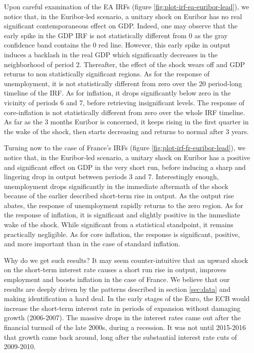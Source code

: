 \documentclass[
  11pt,
]{article}
\begin{document}
Upon careful examination of the EA IRFs (figure \ref{fig:plot-irf-ea-euribor-lead}), we notice that, in the Euribor-led scenario, a unitary shock on Euribor has no real significant contemporaneous effect on GDP.
Indeed, one may observe that the early spike in the GDP IRF is not statistically different from 0 as the gray confidence band contains the 0 red line.
However, this early spike in output induces a backlash in the real GDP which significantly decreases in the neighborhood of period 2.
Thereafter, the effect of the shock wears off and GDP returns to non statistically significant regions.
As for the response of unemployment, it is not statistically different from zero over the 20 period-long timeline of the IRF.
As for inflation, it drops significantly below zero in the vicinity of periods 6 and 7, before retrieving insignificant levels.
The response of core-inflation is not statistically different from zero over the whole IRF timeline.
As far as the 3 months Euribor is concerned, it keeps rising in the first quarter in the wake of the shock, then starts decreasing and returns to normal after 3 years.

Turning now to the case of France's IRFs (figure \ref{fig:plot-irf-fr-euribor-lead}), we notice that, in the Euribor-led scenario, a unitary shock on Euribor has a positive and significant effect on GDP in the very short run, before inducing a sharp and lingering drop in output between periods 3 and 7.
Interestingly enough, unemployment drops significantly in the immediate aftermath of the shock because of the earlier described short-term rise in output.
As the output rise abates, the response of unemployment rapidly returns to the zero region.
As for the response of inflation, it is significant and slightly positive in the immediate wake of the shock.
While significant from a statistical standpoint, it remains practically negligible.
As for core inflation, the response is significant, positive, and more important than in the case of standard inflation.

Why do we get such results? It may seem counter-intuitive that an upward shock on the short-term interest rate causes a short run rise in output, improves employment and boosts inflation in the case of France.
We believe that our results are deeply driven by the patterns described in section \ref{sec:data} and making identification a hard deal.
In the early stages of the Euro, the ECB would increase the short-term interest rate in periods of expansion without damaging growth (2006-2007).
The massive drops in the interest rates came out after the financial turmoil of the late 2000s, during a recession.
It was not until 2015-2016 that growth came back around, long after the substantial interest rate cuts of 2009-2010.
\end{document}
